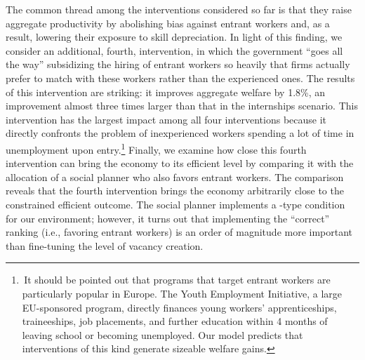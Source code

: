 \documentclass[12pt]{article} %
\theoremstyle{definition}
\begin{document}
The common thread among the interventions considered so far is that they raise aggregate productivity by abolishing bias against entrant workers and, as a result, lowering their exposure to skill depreciation.
In light of this finding, we consider an additional, fourth, intervention, in which the government ``goes all the way'' subsidizing the hiring of entrant workers so heavily that firms actually prefer to match with these workers rather than the experienced ones. 
The results of this intervention are striking: it improves aggregate welfare by 1.8\%, an improvement almost three times larger than that in the internships scenario.
This intervention has the largest impact among all four interventions because it directly confronts the problem of inexperienced workers spending a lot of time in unemployment upon entry.\footnote{\,It should be pointed out that programs that target entrant workers are particularly popular in Europe.
The Youth Employment Initiative, a large EU-sponsored program, directly finances young workers' apprenticeships, traineeships, job placements, and further education within 4 months of leaving school or becoming unemployed.
Our model predicts that interventions of this kind generate sizeable welfare gains.}
Finally, we examine how close this fourth intervention can bring the economy to its efficient level by comparing it with the allocation of a social planner who also favors entrant workers. 
The comparison reveals that the fourth intervention brings the economy arbitrarily close to the constrained efficient outcome. 
The social planner implements a \cite{hosios1990efficiency}-type condition for our environment; however, it turns out that implementing the ``correct'' ranking (i.e., favoring entrant workers) is an order of magnitude more important than fine-tuning the level of vacancy creation.
\end{document}

